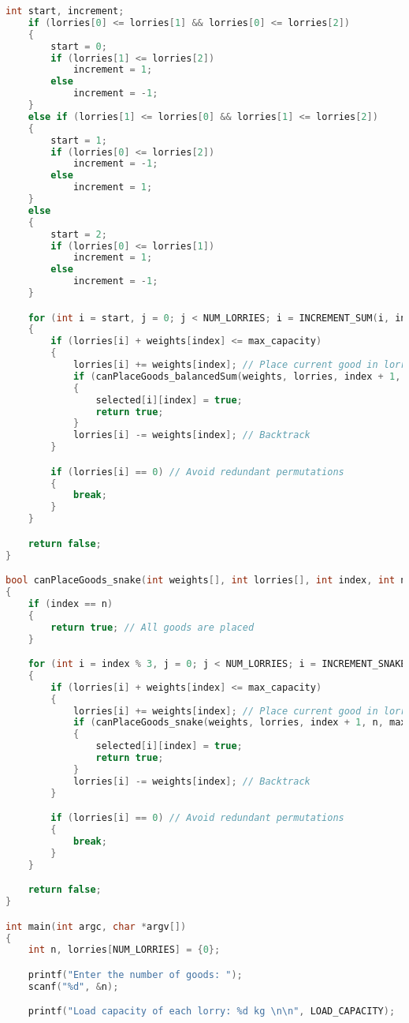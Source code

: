 \documentclass{article}
\begin{document}
\begin{lstlisting}[language=C++, caption=Implementation in C of PseudoCode \ref{algo:main}., label=lst:code1]
    int start, increment;
    if (lorries[0] <= lorries[1] && lorries[0] <= lorries[2])
    {
        start = 0;
        if (lorries[1] <= lorries[2])
            increment = 1;
        else
            increment = -1;
    }
    else if (lorries[1] <= lorries[0] && lorries[1] <= lorries[2])
    {
        start = 1;
        if (lorries[0] <= lorries[2])
            increment = -1;
        else
            increment = 1;
    }
    else
    {
        start = 2;
        if (lorries[0] <= lorries[1])
            increment = 1;
        else
            increment = -1;
    }

    for (int i = start, j = 0; j < NUM_LORRIES; i = INCREMENT_SUM(i, increment), j++)
    {
        if (lorries[i] + weights[index] <= max_capacity)
        {
            lorries[i] += weights[index]; // Place current good in lorry i
            if (canPlaceGoods_balancedSum(weights, lorries, index + 1, n, max_capacity, selected))
            {
                selected[i][index] = true;
                return true;
            }
            lorries[i] -= weights[index]; // Backtrack
        }

        if (lorries[i] == 0) // Avoid redundant permutations
        {
            break;
        }
    }

    return false;
}

bool canPlaceGoods_snake(int weights[], int lorries[], int index, int n, int max_capacity, bool selected[][n])
{
    if (index == n)
    {
        return true; // All goods are placed
    }

    for (int i = index % 3, j = 0; j < NUM_LORRIES; i = INCREMENT_SNAKE(i, index), j++)
    {
        if (lorries[i] + weights[index] <= max_capacity)
        {
            lorries[i] += weights[index]; // Place current good in lorry i
            if (canPlaceGoods_snake(weights, lorries, index + 1, n, max_capacity, selected))
            {
                selected[i][index] = true;
                return true;
            }
            lorries[i] -= weights[index]; // Backtrack
        }

        if (lorries[i] == 0) // Avoid redundant permutations
        {
            break;
        }
    }

    return false;
}

int main(int argc, char *argv[])
{
    int n, lorries[NUM_LORRIES] = {0};

    printf("Enter the number of goods: ");
    scanf("%d", &n);

    printf("Load capacity of each lorry: %d kg \n\n", LOAD_CAPACITY);


\end{lstlisting}
\end{document}
